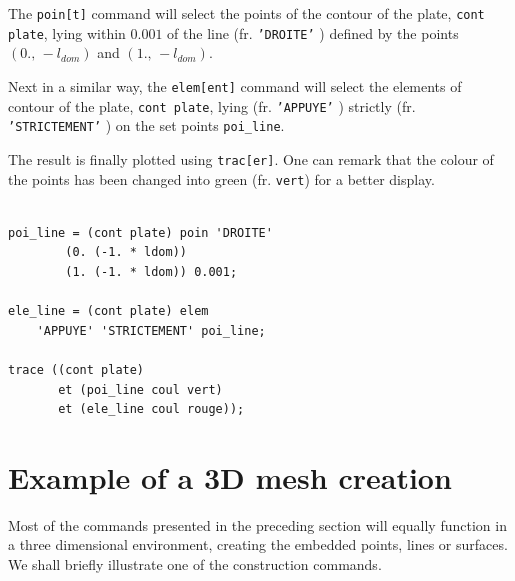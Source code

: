 \begin{castemcom}
The \texttt{poin[t]} command will select the points of the 
contour of the plate, \texttt{cont plate}, lying within 
$0.001$ of the line (fr. \texttt{'DROITE'} ) 
defined by the points 
$(0., \, -l_{dom})$ and $(1., \, -l_{dom})$.

Next in a similar way, the \texttt{elem[ent]} command will 
select the elements of contour of the plate, 
\texttt{cont plate}, lying (fr. \texttt{'APPUYE'} ) 
strictly (fr. \texttt{'STRICTEMENT'} ) on the set points 
\texttt{poi\_line}.

The result is finally plotted using \texttt{trac[er]}. 
One can remark that the colour of the points has been 
changed into green (fr. \texttt{vert}) for a better  
display.

\end{castemcom}
\begin{castemlines}
\begin{verbatim}

poi_line = (cont plate) poin 'DROITE' 
        (0. (-1. * ldom))
        (1. (-1. * ldom)) 0.001;
	       
ele_line = (cont plate) elem
    'APPUYE' 'STRICTEMENT' poi_line;
 
trace ((cont plate)
       et (poi_line coul vert)
       et (ele_line coul rouge));
\end{verbatim}
\end{castemlines}

\section{Example of a 3D mesh creation}
\label{sec:mesh:3d}

Most of the commands presented in the preceding section will 
equally function in a three dimensional environment, creating 
the embedded points, lines or surfaces. We shall briefly illustrate 
one of the construction commands.   

